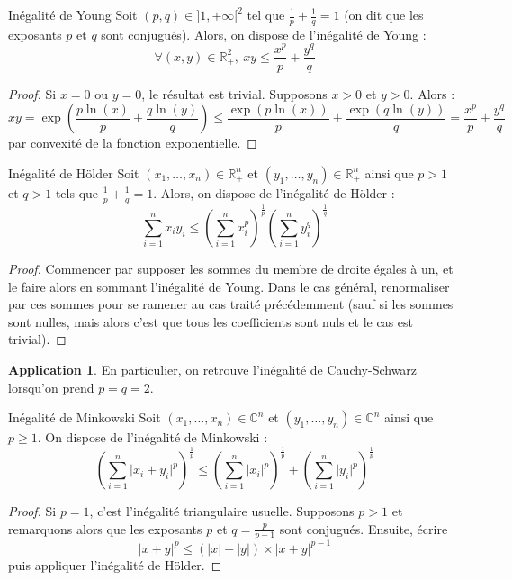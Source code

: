 \documentclass[french]{article}
\newcommand{\R}{\mathbb{R}}
\newcommand{\C}{\mathbb{C}}
\theoremstyle{definition}
\newtheorem*{app}{Application}
\begin{document}
\begin{lem}{Inégalité de Young}
	Soit $(p,q)\in]1,+\infty[^2$ tel que $\displaystyle\frac{1}{p}+\frac{1}{q}=1$ (on dit que les exposants $p$ et $q$ sont conjugués). Alors, on dispose de l'inégalité de Young : $$\forall (x,y)\in\R_+^2,\ xy\leqslant\frac{x^p}{p}+\frac{y^q}{q}$$
\end{lem}
\begin{proof}
	Si $x=0$ ou $y=0$, le résultat est trivial. Supposons $x>0$ et $y>0$. Alors : $$xy=\exp\left(\frac{p\ln(x)}{p}+\frac{q\ln(y)}{q}\right)\leqslant\frac{\exp(p\ln(x))}{p}+\frac{\exp(q\ln(y))}{q}=\frac{x^p}{p}+\frac{y^q}{q}$$ par convexité de la fonction exponentielle.
\end{proof}
\begin{lem}{Inégalité de Hölder}
	Soit $(x_1,\ldots,x_n)\in\R_+^n$ et $(y_1,\ldots,y_n)\in\R_+^n$ ainsi que $p>1$ et $q>1$ tels que $\displaystyle\frac{1}{p}+\frac{1}{q}=1$. Alors, on dispose de l'inégalité de Hölder : $$\sum_{i=1}^{n}x_iy_i\leqslant\left(\sum_{i=1}^{n}x_i^p\right)^{\frac{1}{p}}\left(\sum_{i=1}^{n}y_i^q\right)^{\frac{1}{q}}$$
\end{lem}
\begin{proof}
	Commencer par supposer les sommes du membre de droite égales à un, et le faire alors en sommant l'inégalité de Young. Dans le cas général, renormaliser par ces sommes pour se ramener au cas traité précédemment (sauf si les sommes sont nulles, mais alors c'est que tous les coefficients sont nuls et le cas est trivial).
\end{proof}
\begin{app}
	En particulier, on retrouve l'inégalité de Cauchy-Schwarz lorsqu'on prend $p=q=2$.
\end{app}
\begin{lem}{Inégalité de Minkowski}
	Soit $(x_1,\ldots,x_n)\in\C^n$ et $(y_1,\ldots,y_n)\in\C^n$ ainsi que $p\geqslant 1$. On dispose de l'inégalité de Minkowski : $$\left(\sum_{i=1}^{n}\lvert x_i+y_i\rvert^p\right)^{\frac{1}{p}}\leqslant\left(\sum_{i=1}^{n}\lvert x_i\rvert^p\right)^{\frac{1}{p}}+\left(\sum_{i=1}^{n}\lvert y_i\rvert^p\right)^{\frac{1}{p}}$$
\end{lem}
\begin{proof}
	Si $p=1$, c'est l'inégalité triangulaire usuelle. Supposons $p>1$ et remarquons alors que les exposants $p$ et $q=\displaystyle\frac{p}{p-1}$ sont conjugués. Ensuite, écrire $$\lvert x+y\rvert^p\leqslant(\lvert x\rvert+\lvert y\rvert)\times\lvert x+y\rvert^{p-1}$$ puis appliquer l'inégalité de Hölder.
\end{proof}
\end{document}
